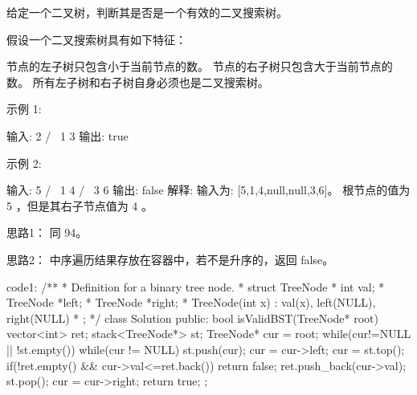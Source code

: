 给定一个二叉树，判断其是否是一个有效的二叉搜索树。

假设一个二叉搜索树具有如下特征：

    节点的左子树只包含小于当前节点的数。
    节点的右子树只包含大于当前节点的数。
    所有左子树和右子树自身必须也是二叉搜索树。

示例 1:

输入:
    2
   / \
  1   3
输出: true

示例 2:

输入:
    5
   / \
  1   4
     / \
    3   6
输出: false
解释: 输入为: [5,1,4,null,null,3,6]。
     根节点的值为 5 ，但是其右子节点值为 4 。



















思路1：
同 94。



思路2：
中序遍历结果存放在容器中，若不是升序的，返回 false。

















code1:
/**
 * Definition for a binary tree node.
 * struct TreeNode {
 *     int val;
 *     TreeNode *left;
 *     TreeNode *right;
 *     TreeNode(int x) : val(x), left(NULL), right(NULL) {}
 * };
 */
class Solution {
public:
    bool isValidBST(TreeNode* root) {
        vector<int> ret;
        stack<TreeNode*> st;
        TreeNode* cur = root;
        while(cur!=NULL || !st.empty())
        {
            while(cur != NULL)
            {
                st.push(cur);
                cur = cur->left;
            }
            cur = st.top();
            if(!ret.empty() && cur->val<=ret.back()) return false;
            ret.push_back(cur->val);
            st.pop();
            cur = cur->right;
        }
        return true;
    }
};




























